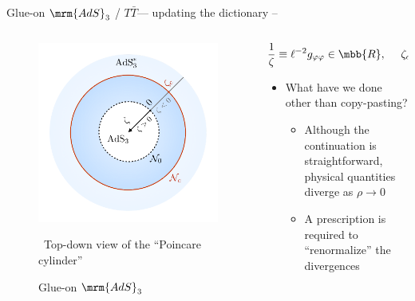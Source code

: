 \documentclass[
	10pt
	,handout
	,noamsthm
]{beamer}
\newcommand{\TTbar}{\texorpdfstring{\ensuremath{T\bar{T}}}{TTbar}\xspace}
\begin{document}
\newcommand{\figGlueon}{
\begin{figure}[!h]
	\centering
	\includegraphics[width=.8\linewidth]{img/diagram.pdf}
	\vspace{-.3\baselineskip}
	\caption{Glue-on $\mrm{AdS}_3$}
	
	\vspace{-.3\baselineskip}
	\scriptsize\ Top-down view of the ``Poincare cylinder''
\end{figure}
}

\begin{frame}{Glue-on $\mrm{AdS}_3$ / \TTbar --- updating the dictionary}{%
	\textcite{Apolo:2023vnm} -- 
}
\begin{columns}
\begin{column}{.4\textwidth}
\figGlueon
\end{column}
\begin{column}{.6\textwidth}
\vspace{-\baselineskip}
\begin{equation}
	\frac{1}{\zeta} \equiv \ell^{-2} g_{\varphi\varphi} \in \mbb{R},
\ \quad
	\zeta_c = - \frac{c \mu}{3\ell^2} \in \mbb{R}
\end{equation}
\vspace{-.5\baselineskip}
\begin{itemize}
\item What have we done other than copy-pasting?
	\begin{itemize}
	\item Although the continuation is straightforward, physical quantities diverge as $\rho \to 0$
	
	\item A prescription is required to ``renormalize'' the divergences
	\end{itemize}
	
\end{itemize}
\end{column}
\end{columns}
\end{frame}
\end{document}
